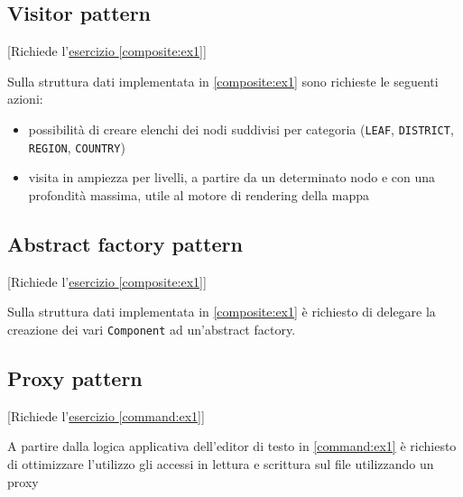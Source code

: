 \documentclass[12pt,a4paper]{article}
\begin{document}
    \subsection{Visitor pattern}\label{pattern:visitors}
    \begin{Exercise}
    
    [Richiede l'\hyperref[composite:ex1]{esercizio \ref{composite:ex1}}]
    
    Sulla struttura dati implementata in \hyperref[composite:ex1]{\ref{composite:ex1}} sono richieste le seguenti azioni:
    \begin{itemize}
        \item possibilità di creare elenchi dei nodi suddivisi per categoria (\texttt{LEAF}, \texttt{DISTRICT}, \texttt{REGION}, \texttt{COUNTRY})
        \item visita in ampiezza per livelli, a partire da un determinato nodo e con una profondità massima, utile al motore di rendering della mappa
    \end{itemize}
    \end{Exercise}

    \subsection{Abstract factory pattern}\label{pattern:abstract_factory}
    \begin{Exercise}
    
    [Richiede l'\hyperref[composite:ex1]{esercizio \ref{composite:ex1}}]
    
    Sulla struttura dati implementata in \hyperref[composite:ex1]{\ref{composite:ex1}} è richiesto di delegare la creazione dei vari \texttt{Component} ad un'abstract factory.
    \end{Exercise}

    \subsection{Proxy pattern}\label{pattern:proxy}
    \begin{Exercise}
    
    [Richiede l'\hyperref[command:ex1]{esercizio \ref{command:ex1}}]
    
    A partire dalla logica applicativa dell'editor di testo in \hyperref[command:ex1]{\ref{command:ex1}} è richiesto di ottimizzare l'utilizzo gli accessi in lettura e scrittura sul file utilizzando un proxy
    \end{Exercise}
    
\end{document}
